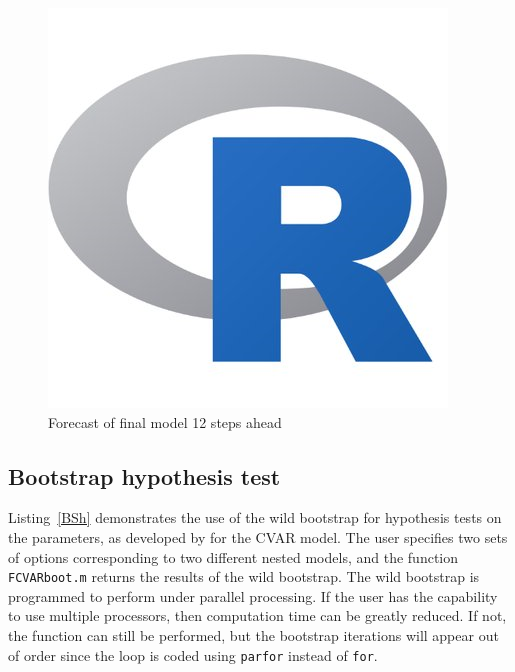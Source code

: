 \documentclass[10pt]{article}
\begin{document}
\begin{figure}[H]
  \centering
  \caption{Forecast of final model 12 steps ahead}
  \label{fig:forecast}
  \includegraphics[scale = 1, keepaspectratio=true]{forecast.png}
\end{figure}

\subsection{Bootstrap hypothesis test}
\label{sec:bootstr-hypoth-test}

Listing~\ref{BSh} demonstrates the use of the wild bootstrap for hypothesis tests on the parameters, as developed by \cite{Boswijk2013} for the CVAR model. The user specifies two sets of options corresponding to two different nested models, and the function \verb|FCVARboot.m| returns the results of the wild bootstrap. The wild bootstrap is programmed to perform under parallel processing. If the user has the capability to use multiple processors, then computation time can be greatly reduced. If not, the function can still be performed, but the bootstrap iterations will appear out of order since the loop is coded using \verb|parfor| instead of \verb|for|.
\end{document}

